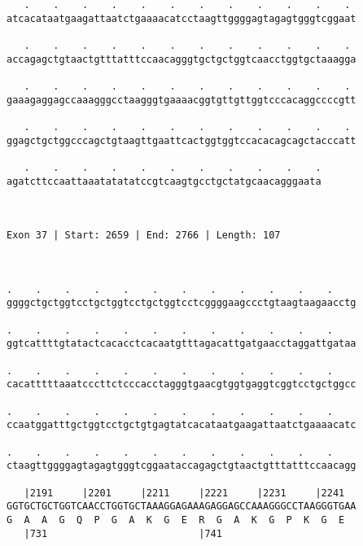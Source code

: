 \documentclass{article}
\begin{document}
\begin{Verbatim}
   .    .    .    .    .    .    .    .    .    .    .    . 
atcacataatgaagattaatctgaaaacatcctaagttggggagtagagtgggtcggaat
                                                            
   .    .    .    .    .    .    .    .    .    .    .    . 
accagagctgtaactgtttatttccaacagggtgctgctggtcaacctggtgctaaagga
                                                            
   .    .    .    .    .    .    .    .    .    .    .    . 
gaaagaggagccaaagggcctaagggtgaaaacggtgttgttggtcccacaggccccgtt
                                                            
   .    .    .    .    .    .    .    .    .    .    .    . 
ggagctgctggcccagctgtaagttgaattcactggtggtccacacagcagctacccatt
                                                            
   .    .    .    .    .    .    .    .    .    .    .
agatcttccaattaaatatatatccgtcaagtgcctgctatgcaacagggaata
                                                      
                                                      
 
Exon 37 | Start: 2659 | End: 2766 | Length: 107



.    .    .    .    .    .    .    .    .    .    .    .    
ggggctgctggtcctgctggtcctgctggtcctcggggaagccctgtaagtaagaacctg
                                                            
.    .    .    .    .    .    .    .    .    .    .    .    
ggtcattttgtatactcacacctcacaatgtttagacattgatgaacctaggattgataa
                                                            
.    .    .    .    .    .    .    .    .    .    .    .    
cacatttttaaatcccttctcccacctagggtgaacgtggtgaggtcggtcctgctggcc
                                                            
.    .    .    .    .    .    .    .    .    .    .    .    
ccaatggatttgctggtcctgctgtgagtatcacataatgaagattaatctgaaaacatc
                                                            
.    .    .    .    .    .    .    .    .    .    .    .    
ctaagttggggagtagagtgggtcggaataccagagctgtaactgtttatttccaacagg
                                                            
   |2191     |2201     |2211     |2221     |2231     |2241  
GGTGCTGCTGGTCAACCTGGTGCTAAAGGAGAAAGAGGAGCCAAAGGGCCTAAGGGTGAA
G  A  A  G  Q  P  G  A  K  G  E  R  G  A  K  G  P  K  G  E  
   |731                          |741                       
  

\end{Verbatim}
\end{document}
